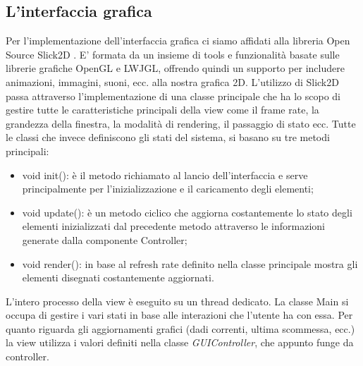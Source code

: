 \documentclass{llncs}
\begin{document}
		\subsection{L'interfaccia grafica}
			Per l'implementazione dell'interfaccia grafica ci siamo affidati alla libreria Open Source Slick2D \cite{Slick}. E' formata da un insieme di tools e funzionalità basate sulle librerie grafiche OpenGL e LWJGL, offrendo quindi un supporto per includere animazioni, immagini, suoni, ecc. alla nostra grafica 2D. L'utilizzo di Slick2D passa attraverso l'implementazione di una classe principale che ha lo scopo di gestire tutte le caratteristiche principali della view come il frame rate, la grandezza della finestra, la modalità di rendering, il passaggio di stato ecc. Tutte le classi che invece definiscono gli stati del sistema, si basano su tre metodi principali: 
				\begin{itemize}
					\item void init(): è il metodo richiamato al lancio dell'interfaccia e serve principalmente per l'inizializzazione e il caricamento degli elementi;
					\item void update(): è un metodo ciclico che aggiorna costantemente lo stato degli elementi inizializzati dal precedente metodo attraverso le informazioni generate dalla componente Controller;
					\item void render(): in base al refresh rate definito nella classe principale mostra gli elementi disegnati costantemente aggiornati.
				\end{itemize}
			L'intero processo della view è eseguito su un thread dedicato. La classe Main si occupa di gestire i vari stati in base alle interazioni che l'utente ha con essa.
			Per quanto riguarda gli aggiornamenti grafici (dadi correnti, ultima scommessa, ecc.) la view utilizza i valori definiti nella classe \textit{GUIController}, che appunto funge da controller.
\end{document}
